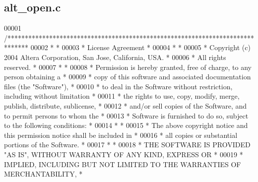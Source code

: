 \subsection{alt\+\_\+open.\+c}
\label{alt__open_8c_source}

\begin{DoxyCode}
00001 \textcolor{comment}{/******************************************************************************}
00002 \textcolor{comment}{*                                                                             *}
00003 \textcolor{comment}{* License Agreement                                                           *}
00004 \textcolor{comment}{*                                                                             *}
00005 \textcolor{comment}{* Copyright (c) 2004 Altera Corporation, San Jose, California, USA.           *}
00006 \textcolor{comment}{* All rights reserved.                                                        *}
00007 \textcolor{comment}{*                                                                             *}
00008 \textcolor{comment}{* Permission is hereby granted, free of charge, to any person obtaining a     *}
00009 \textcolor{comment}{* copy of this software and associated documentation files (the "Software"),  *}
00010 \textcolor{comment}{* to deal in the Software without restriction, including without limitation   *}
00011 \textcolor{comment}{* the rights to use, copy, modify, merge, publish, distribute, sublicense,    *}
00012 \textcolor{comment}{* and/or sell copies of the Software, and to permit persons to whom the       *}
00013 \textcolor{comment}{* Software is furnished to do so, subject to the following conditions:        *}
00014 \textcolor{comment}{*                                                                             *}
00015 \textcolor{comment}{* The above copyright notice and this permission notice shall be included in  *}
00016 \textcolor{comment}{* all copies or substantial portions of the Software.                         *}
00017 \textcolor{comment}{*                                                                             *}
00018 \textcolor{comment}{* THE SOFTWARE IS PROVIDED "AS IS", WITHOUT WARRANTY OF ANY KIND, EXPRESS OR  *}
00019 \textcolor{comment}{* IMPLIED, INCLUDING BUT NOT LIMITED TO THE WARRANTIES OF MERCHANTABILITY,    *}

\end{DoxyCode}
